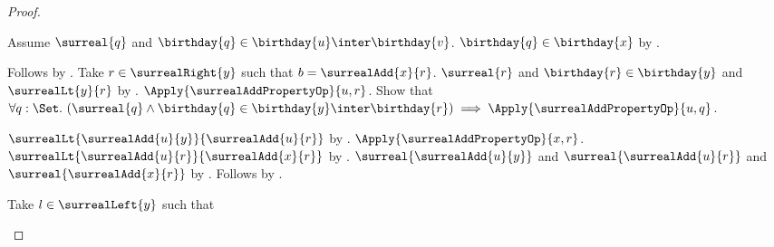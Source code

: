 \begin{proof}
\begin{subproof}
\begin{subproof}
\begin{byCase}
\begin{byCase}
\begin{subproof}
                                Assume $\surreal{q}$ and
                                    $\birthday{q}\in
                                        \birthday{u}\inter\birthday{v}$.
                                $\birthday{q}\in\birthday{x}$
                                    by .
                            \end{subproof}
                            Follows by
                                .
                            Take $r\in\surrealRight{y}$ such that
                                $b=\surrealAdd{x}{r}$.
                            $\surreal{r}$ and
                                $\birthday{r}\in\birthday{y}$ and
                                $\surrealLt{y}{r}$
                                by .
                            $\Apply{\surrealAddPropertyOp}{u,r}$.
                            Show that $\forall q:\Set.\ (\surreal{q}\land
                                \birthday{q}\in
                                    \birthday{y}\inter\birthday{r})
                                \implies
                                \Apply{\surrealAddPropertyOp}{u,q}$.
                            \begin{subproof}
                            \end{subproof}
                            $\surrealLt{\surrealAdd{u}{y}}
                                {\surrealAdd{u}{r}}$
                                by .
                            $\Apply{\surrealAddPropertyOp}{x,r}$.
                            $\surrealLt{\surrealAdd{u}{r}}
                                {\surrealAdd{x}{r}}$
                                by .
                            $\surreal{\surrealAdd{u}{y}}$ and
                                $\surreal{\surrealAdd{u}{r}}$ and
                                $\surreal{\surrealAdd{x}{r}}$
                                by .
                            Follows by .
                    \end{byCase}
                    Take $l\in\surrealLeft{y}$ such that

\end{byCase}
\end{subproof}
\end{subproof}
\end{proof}
